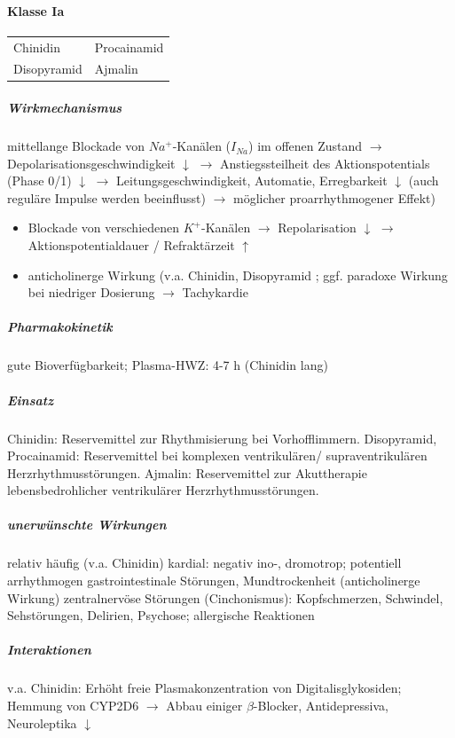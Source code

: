 \documentclass[10pt,a4paper]{report}
\begin{document}
\paragraph{Klasse Ia} %

\begin{tabularx}{\textwidth}{XX}
Chinidin&Procainamid\\
Disopyramid&Ajmalin\\
\end{tabularx}

\subparagraph{Wirkmechanismus} mittellange Blockade von $Na^+$-Kanälen ($I_{Na}$) im offenen Zustand $\rightarrow$ Depolarisationsgeschwindigkeit $\downarrow$ $\rightarrow$ Anstiegssteilheit des Aktionspotentials (Phase 0/1) $\downarrow$ $\rightarrow$ Leitungsgeschwindigkeit, Automatie, Erregbarkeit $\downarrow$ (auch reguläre Impulse werden beeinflusst) $\rightarrow$ möglicher proarrhythmogener  Effekt)

\begin{itemize}
	\item Blockade von verschiedenen $K^+$-Kanälen $\rightarrow$ Repolarisation $\downarrow$ $\rightarrow$ Aktionspotentialdauer / Refraktärzeit $\uparrow$
	\item anticholinerge Wirkung (v.a. Chinidin, Disopyramid ; ggf. paradoxe Wirkung bei niedriger Dosierung  $\rightarrow$ Tachykardie
\end{itemize}

\subparagraph{Pharmakokinetik} gute Bioverfügbarkeit; Plasma-HWZ: 4-7 h (Chinidin lang)

\subparagraph{Einsatz}	Chinidin: Reservemittel zur Rhythmisierung bei Vorhofflimmern. Disopyramid, Procainamid: Reservemittel bei komplexen ventrikulären/ supraventrikulären Herzrhythmusstörungen. Ajmalin: Reservemittel zur Akuttherapie lebensbedrohlicher ventrikulärer Herzrhythmusstörungen.

\subparagraph{unerwünschte Wirkungen} relativ häufig (v.a. Chinidin) kardial: negativ ino-, dromotrop; potentiell arrhythmogen
gastrointestinale Störungen, Mundtrockenheit (anticholinerge Wirkung) zentralnervöse Störungen (Cinchonismus): Kopfschmerzen, Schwindel, Sehstörungen, Delirien, Psychose;   allergische Reaktionen

\subparagraph{Interaktionen} v.a. Chinidin: Erhöht freie Plasmakonzentration von Digitalisglykosiden; Hemmung von CYP2D6 $\rightarrow$ Abbau einiger $\beta$-Blocker, Antidepressiva, Neuroleptika $\downarrow$
\end{document}
